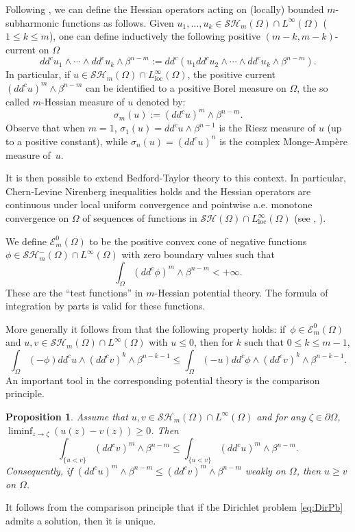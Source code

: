 \documentclass[11pt]{article}
\numberwithin{equation}{section}
\newcommand{\loc}{\mathrm{loc}}
\newtheorem{proposition}[theorem]{Proposition}
\theoremstyle{definition}
\theoremstyle{plain}
\theoremstyle{definition}
\begin{document}
Following \cite{Bl05}, we can define the Hessian operators acting on (locally) bounded $m$-subharmonic functions as follows. Given $u_1,\dots, u_k \in \mathcal{SH}_m (\Omega) \cap L^{\infty} (\Omega)$ ($1 \leq k \leq m$), one can define inductively the following positive $(m-k,m-k)$-current on $\Omega$
\[
dd^c u_1 \wedge \cdots \wedge dd^c u_k \wedge \beta^{n - m}:= dd^c (u_1 dd^c u_2 \wedge \cdots \wedge dd^c u_k \wedge \beta^{n - m}).
\]
In particular, if $u \in \mathcal{SH}_m (\Omega) \cap L^{\infty}_{\loc} (\Omega)$, the positive current $(dd^c u)^m \wedge \beta^{n-m}$ can be identified to a positive Borel measure on $\Omega$, the so called $m$-Hessian measure of $u$ denoted by:
\[
\sigma_m (u):= (dd^c u)^m \wedge \beta^{n-m}.
\]
Observe that when $m\!=\! 1$, $\sigma_1 (u) \!=\! dd^c u \wedge \beta^{n-1}$ is the Riesz measure of $u$ (up to a positive constant), while $\sigma_n (u) \!=\! (dd^c u)^n$ is the complex Monge-Ampère measure of~$u$.

It is then possible to extend Bedford-Taylor theory to this context.
In particular, Chern-Levine Nirenberg inequalities holds and the Hessian operators are continuous under local uniform convergence and pointwise a.e. monotone convergence
on $\Omega$ of sequences of functions in $\mathcal{SH} (\Omega) \cap L^{\infty}_{\loc} (\Omega)$ (see \cite{Bl05}, \cite{Lu12}).

We define $\mathcal{E}_m^0 (\Omega) $ to be the positive convex cone of negative functions $\phi \in \mathcal{SH}^-_m (\Omega) \cap L^{\infty} (\Omega)$ with zero boundary values such that
\[
\int_{\Omega} (dd^c \phi)^m \wedge \beta^{n - m} < + \infty.
\]
These are the ``test functions'' in $m$-Hessian potential theory. The formula of integration by parts is valid for these functions.

More generally it follows from \cite{Lu12,Lu15} that the following property holds: if~$\phi \in \mathcal{E}_m^0 (\Omega) $ and $u, v \in \mathcal{SH}_m (\Omega) \cap L^{\infty} (\Omega)$ with $u \leq 0$, then for $k$ such that $0 \leq k \leq m - 1$,
\begin{equation} \label{eq:testinequality}
\int_\Omega (-\phi) dd^c u \wedge (dd^c v)^k \wedge \beta^{n - k-1} \leq \int_\Omega (-u) dd^c \phi \wedge (dd^c v)^k \wedge \beta^{n - k-1}.
\end{equation}
An important tool in the corresponding potential theory is the comparison principle.

\begin{proposition} \label{prop:comparison principle}
Assume that $u,v\in \mathcal{SH}_m(\Omega)\cap L^{\infty}(\Omega)$ and for any $\zeta \in \partial \Omega$, $\liminf_{z \to \zeta }(u(z)- v(z))\geq 0$. Then
\[
\int_{\{u<v\}}(dd^c v)^m\wedge\beta^{n-m} \leq \int_{\{u<v\}}(dd^c u)^m\wedge\beta^{n-m}.
\]
Consequently, if $(dd^cu)^m\wedge\beta^{n-m}\leq(dd^cv)^m\wedge\beta^{n-m}$ weakly on $\Omega$, then $u \geq v$ on $\Omega$.

\end{proposition}
It follows from the comparison principle that if the Dirichlet problem \eqref{eq:DirPb} admits a solution, then it is unique.
\end{document}
